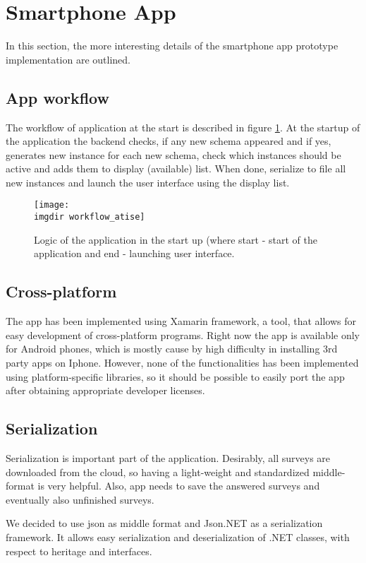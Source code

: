 \section{Smartphone App}
\label{sec:app}
In this section, the more interesting details of the smartphone app prototype implementation are outlined.
\subsection{App workflow}
The workflow of application at the start is described in figure \ref{fig:startup-workflow}. At the startup of the application the backend checks, if any new schema appeared and if yes, generates new instance for each new schema, check which instances should be active and adds them to display (available) list. When done, serialize to file all new instances and launch the user interface using the display list. 

\begin{figure}[!htbp]
  \centering
    \centering
    \texttt{[image: \\imgdir workflow\_atise]}
    \caption{Logic of the application in the start up (where start - start of the application and end - launching user interface.}
    \label{fig:startup-workflow}
\end{figure}
\subsection{Cross-platform}
The app has been implemented using Xamarin framework, a tool, that allows for easy development of cross-platform programs. Right now the app is available only for Android phones, which is mostly cause by high difficulty in installing 3rd party apps on Iphone. However, none of the functionalities has been implemented using platform-specific libraries, so it should be possible to easily port the app after obtaining appropriate developer licenses. 
\subsection{Serialization} 
Serialization is important part of the application. Desirably, all surveys are downloaded from the cloud, so having a light-weight and standardized middle-format is very helpful. Also, app needs to save the answered surveys and eventually also unfinished surveys. 

We decided to use json as middle format and Json.NET as a serialization framework. It allows easy serialization and deserialization of .NET classes, with respect to heritage and interfaces. 

